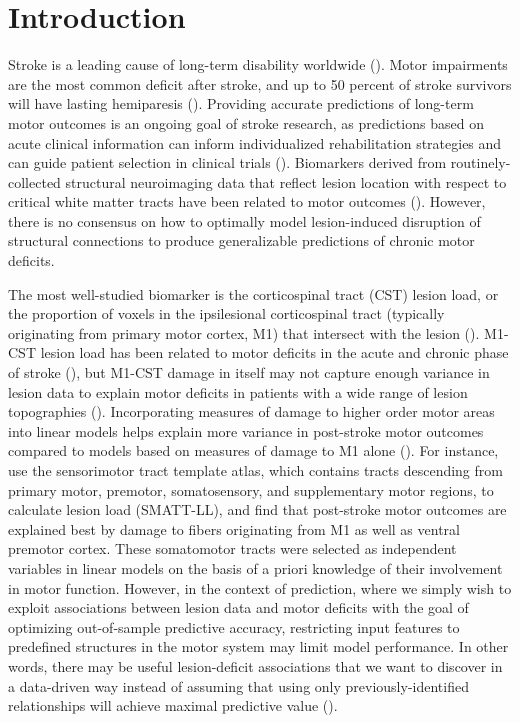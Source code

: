 \documentclass[10pt]{article}
\begin{document}
\section{Introduction}
Stroke is a leading cause of long-term disability worldwide (\cite{Katan2018-qn}). Motor impairments are the most common deficit after stroke, and up to 50 percent of stroke survivors will have lasting hemiparesis (\cite{Kelly-Hayes2003-sp}). Providing accurate predictions of long-term motor outcomes is an ongoing goal of stroke research, as predictions based on acute clinical information can inform individualized rehabilitation strategies and can guide patient selection in clinical trials (\cite{Bonkhoff2022-op, Boyd2017-gs}). Biomarkers derived from routinely-collected structural neuroimaging data that reflect lesion location with respect to critical white matter tracts have been related to motor outcomes (\cite{Tozlu2020-qa, Kuceyeski2016-vj, Griffis2019-cy, Salvalaggio2020-pe, Bowren2022-rs}). However, there is no consensus on how to optimally model lesion-induced disruption of structural connections to produce generalizable predictions of chronic motor deficits. 

The most well-studied biomarker is the corticospinal tract (CST) lesion load, or the proportion of voxels in the ipsilesional corticospinal tract (typically originating from primary motor cortex, M1) that intersect with the lesion (\cite{Zhu2010-qh, Feng2015-du, Findlater2019-je, Lam2018-xh, Pineiro2000-dv}). M1-CST lesion load has been related to motor deficits in the acute and chronic phase of stroke (\cite{Boyd2017-gs, Kim2017-xe}), but M1-CST damage in itself may not capture enough variance in lesion data to explain motor deficits in patients with a wide range of lesion topographies (\cite{Park2016-te,Findlater2019-je, Paul2023-ce}). Incorporating measures of damage to higher order motor areas into linear models helps explain more variance in post-stroke motor outcomes compared to models based on measures of damage to M1 alone (\cite{Ito2022-em,  Rondina2016-ds, Rondina2017-ij, Schulz2012-yy, Park2016-te}). For instance, \cite{Ito2022-em} use the sensorimotor tract template atlas, which contains tracts descending from primary motor, premotor, somatosensory, and supplementary motor regions, to calculate lesion load (SMATT-LL), and find that post-stroke motor outcomes are explained best by damage to fibers originating from M1 as well as ventral premotor cortex. These somatomotor tracts were selected as independent variables in linear models on the basis of a priori knowledge of their involvement in motor function. However, in the context of prediction, where we simply wish to exploit associations between lesion data and motor deficits with the goal of optimizing out-of-sample predictive accuracy, restricting input features to predefined structures in the motor system may limit model performance. In other words, there may be useful lesion-deficit associations that we want to discover in a data-driven way instead of assuming that using only previously-identified relationships will achieve maximal predictive value (\cite{Bzdok2020-py, Bonkhoff2022-op}).
\end{document}
